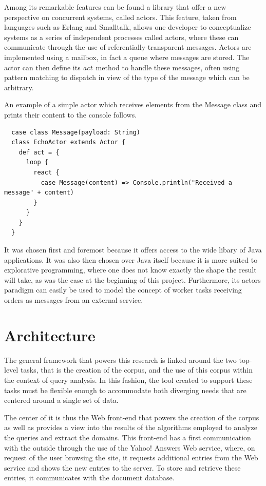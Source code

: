 Among its remarkable features can be found a library that offer a new perspective on concurrent systems, called actors. This feature, taken from languages such as Erlang and Smalltalk, allows one developer to conceptualize systems as a series of independent processes called actors, where these can communicate through the use of referentially-transparent messages. Actors are implemented using a mailbox, in fact a queue where messages are stored. The actor can then define its \emph{act}\ method to handle these messages, often using pattern matching to dispatch in view of the type of the message which can be arbitrary.

An example of a simple actor which receives elements from the Message class and prints their content to the console follows.

\begin{verbatim}
  case class Message(payload: String)
  class EchoActor extends Actor {
    def act = {
      loop {
        react {
          case Message(content) => Console.println("Received a message" + content)
        }
      }
    }
  }
\end{verbatim}

It was chosen first and foremost because it offers access to the wide libary of Java applications. It was also then chosen over Java itself because it is more suited to explorative programming, where one does not know exactly the shape the result will take, as was the case at the beginning of this project. Furthermore, its actors paradigm can easily be used to model the concept of worker tasks receiving orders as messages from an external service.



\section{Architecture} %
\label{sec:architecture}

The general framework that powers this research is linked around the two top-level tasks, that is the creation of the corpus, and the use of this corpus within the context of query analysis. In this fashion, the tool created to support these tasks must be flexible enough to accommodate both diverging needs that are centered around a single set of data.

The center of it is thus the Web front-end that powers the creation of the corpus as well as provides a view into the results of the algorithms employed to analyze the queries and extract the domains. This front-end has a first communication with the outside through the use of the Yahoo! Answers Web service, where, on request of the user browsing the site, it requests additional entries from the Web service and shows the new entries to the server. To store and retrieve these entries, it communicates with the document database.

